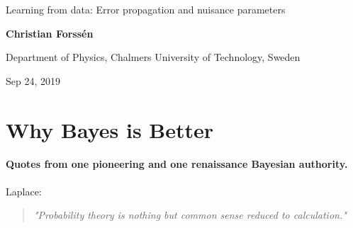 \documentclass[%
oneside,                 %
final,                   %
10pt]{article}
\begin{document}

\newcommand{\exercisesection}[1]{\subsection*{#1}}







\thispagestyle{empty}

\begin{center}
{\LARGE\bf
\begin{spacing}{1.25}
Learning from data: Error propagation and nuisance parameters
\end{spacing}
}
\end{center}


\begin{center}
{\bf Christian Forssén}
\end{center}

    \begin{center}
\centerline{{\small Department of Physics, Chalmers University of Technology, Sweden}}
\end{center}
    

\begin{center}
Sep 24, 2019
\end{center}

\vspace{1cm}


\section{Why Bayes is Better}

\paragraph{Quotes from one pioneering and one renaissance Bayesian authority.}
Laplace:

\begin{quote}
\emph{"Probability theory is nothing but common sense reduced to calculation."}
\end{quote}
\end{document}
